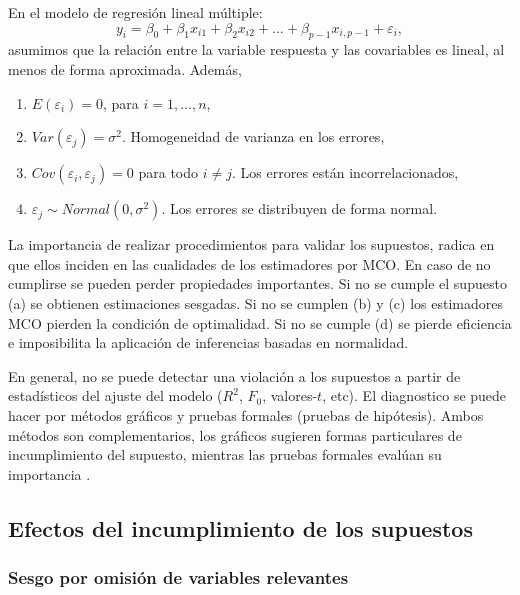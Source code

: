 \documentclass[
]{article}
\providecommand{\tightlist}{%
  \setlength{\itemsep}{0pt}\setlength{\parskip}{0pt}}
\begin{document}
En el modelo de regresión lineal múltiple:
\[
y_{i}=\beta_{0} + \beta_{1} x_{i1}+\beta_{2} x_{i2}+\ldots + \beta_{p-1} x_{i,p-1} +\varepsilon_{i},
\]
asumimos que la relación entre la variable respuesta y las covariables es lineal, al menos de forma aproximada. Además,

\begin{enumerate}
\def\labelenumi{\alph{enumi}.}
\tightlist
\item
  \(E(\varepsilon_{i})=0\), para \(i=1,\ldots,n\),
\item
  \(Var(\varepsilon_{j})=\sigma^{2}\). Homogeneidad de varianza en los errores,
\item
  \(Cov(\varepsilon_{i},\varepsilon_{j})=0\) para todo \(i\neq j\). Los errores están incorrelacionados,
\item
  \(\varepsilon_{j} \sim Normal(0, \sigma^{2})\). Los errores se distribuyen de forma normal.
\end{enumerate}

La importancia de realizar procedimientos para validar los supuestos, radica en que ellos inciden en las cualidades de los estimadores por MCO. En caso de no cumplirse se pueden perder propiedades importantes. Si no se cumple el supuesto (a) se obtienen estimaciones sesgadas. Si no se cumplen (b) y (c) los estimadores MCO pierden la condición de optimalidad. Si no se cumple (d) se pierde eficiencia e imposibilita la aplicación de inferencias basadas en normalidad.

En general, no se puede detectar una violación a los supuestos a partir de estadísticos del ajuste del modelo (\(R^2\), \(F_0\), valores-\(t\), etc). El diagnostico se puede hacer por métodos gráficos y pruebas formales (pruebas de hipótesis). Ambos métodos son complementarios, los gráficos sugieren formas particulares de incumplimiento del supuesto, mientras las pruebas formales evalúan su importancia \citep{behar_validacion_2002}.

\hypertarget{efectos-del-incumplimiento-de-los-supuestos}{%
\subsection{Efectos del incumplimiento de los supuestos}\label{efectos-del-incumplimiento-de-los-supuestos}}

\hypertarget{sesgo-por-omisiuxf3n-de-variables-relevantes}{%
\subsubsection{Sesgo por omisión de variables relevantes}\label{sesgo-por-omisiuxf3n-de-variables-relevantes}}
\end{document}
